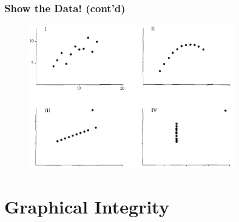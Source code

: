 \documentclass[notes, aspectratio=1610]{beamer}
\begin{document}
\begin{frame}
	\frametitle{Show the Data! (cont'd)}
	\begin{figure}
		\begin{small}
			\begin{center}
				\includegraphics[width=0.80\textwidth]{
					images/anscombe_ii.png
					}
			\end{center}
		\end{small}
	\end{figure}
	
\end{frame}
\section{Graphical Integrity}
\end{document}

